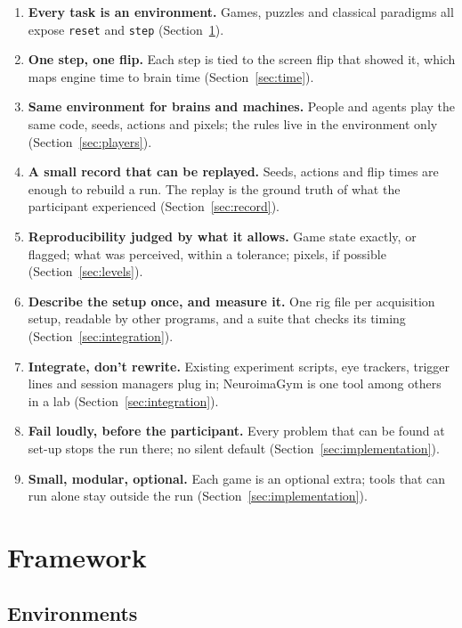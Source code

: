 \documentclass{article}
\newcommand{\code}[1]{\texttt{#1}}
\begin{document}
\begin{enumerate}
  \item \textbf{Every task is an environment.} Games, puzzles and classical paradigms all expose \code{reset} and \code{step} (Section~\ref{sec:framework}).
  \item \textbf{One step, one flip.} Each step is tied to the screen flip that showed it, which maps engine time to brain time (Section~\ref{sec:time}).
  \item \textbf{Same environment for brains and machines.} People and agents play the same code, seeds, actions and pixels; the rules live in the environment only (Section~\ref{sec:players}).
  \item \textbf{A small record that can be replayed.} Seeds, actions and flip times are enough to rebuild a run. The replay is the ground truth of what the participant experienced (Section~\ref{sec:record}).
  \item \textbf{Reproducibility judged by what it allows.} Game state exactly, or flagged; what was perceived, within a tolerance; pixels, if possible (Section~\ref{sec:levels}).
  \item \textbf{Describe the setup once, and measure it.} One rig file per acquisition setup, readable by other programs, and a suite that checks its timing (Section~\ref{sec:integration}).
  \item \textbf{Integrate, don't rewrite.} Existing experiment scripts, eye trackers, trigger lines and session managers plug in; NeuroimaGym is one tool among others in a lab (Section~\ref{sec:integration}).
  \item \textbf{Fail loudly, before the participant.} Every problem that can be found at set-up stops the run there; no silent default (Section~\ref{sec:implementation}).
  \item \textbf{Small, modular, optional.} Each game is an optional extra; tools that can run alone stay outside the run (Section~\ref{sec:implementation}).
\end{enumerate}

\section{Framework}
\label{sec:framework}

\subsection{Environments}
\label{sec:environments}
\end{document}
